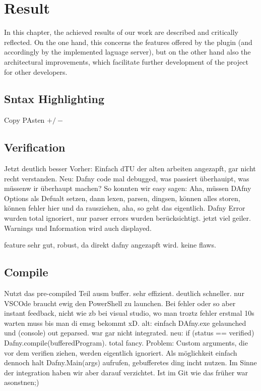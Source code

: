 \section{Result}
In this chapter, the achieved results of our work are described and critically reflected.
On the one hand, this concerns the features offered by the plugin
(and accordingly by the implemented laguage server),
but on the other hand also the architectural improvements,
which facilitate further development of the project for other developers.


\subsection{Sntax Highlighting}
Copy PAsten $+/-$

\subsection{Verification}
Jetzt deutlich besser
Vorher: Einfach dTU der alten arbeiten angezapft, gar nicht recht verstanden.
Neu: Dafny code mal debugged, was passiert überhauipt, was müssenw ir überhaupt machen?
So konnten wir easy sagen: Aha, müssen DAfny Options als Defualt setzen, dann lexen, parsen, dingsen, können alles storen, können fehler hier und da rausziehen, aha, so geht das eigentlich.
Dafny Error wurden total ignoriert, nur parser errors wurden berücksichtigt. jetzt viel geiler.
Warnings und Information wird auch displayed.

feature sehr gut, robust, da direkt dafny angezapft wird. keine flaws.


\subsection{Compile}
Nutzt das pre-compiled Teil ausm buffer. sehr effizient. deutlich schneller. nur VSCOde braucht ewig den PowerShell zu launchen.
Bei fehler oder so aber instant feedback, nicht wie zb bei visual studio, wo man troztz fehler erstmal 10s warten muss bis man di emsg bekommt xD.
alt: einfach DAfny.exe gelaunched und (console) out geparsed.
war gar nicht integrated.
neu: if (status == verified) Dafny.compile(bufferedProgram).
total fancy.
Problem: Custom arguments, die vor dem verifien ziehen, werden eigentlich ignoriert. Als möglichkeit einfach dennoch halt Dafny.Main(args) aufrufen, gebufferetes ding incht nutzen. Im Sinne der integration haben wir aber darauf verzichtet. Ist im Git wie das früher war asonstnen;)


